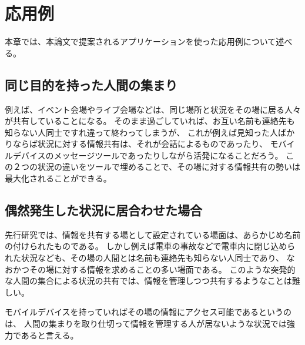 \chapter{応用例}\label{chap:application}

本章では、本論文で提案されるアプリケーションを使った応用例について述べる。

\newpage

\section{同じ目的を持った人間の集まり}

例えば、イベント会場やライブ会場などは、同じ場所と状況をその場に居る人々が共有していることになる。
そのまま過ごしていれば、お互い名前も連絡先も知らない人同士ですれ違って終わってしまうが、
これが例えば見知った人ばかりならば状況に対する情報共有は、それが会話によるものであったり、
モバイルデバイスのメッセージツールであったりしながら活発になることだろう。
この２つの状況の違いをツールで埋めることで、その場に対する情報共有の勢いは最大化されることができる。

\section{偶然発生した状況に居合わせた場合}

先行研究では、情報を共有する場として設定されている場面は、あらかじめ名前の付けられたものである。
しかし例えば電車の事故などで電車内に閉じ込められた状況なども、その場の人間とは名前も連絡先も知らない人同士であり、
なおかつその場に対する情報を求めることの多い場面である。
このような突発的な人間の集合による状況の共有では、情報を管理しつつ共有するようなことは難しい。

モバイルデバイスを持っていればその場の情報にアクセス可能であるというのは、
人間の集まりを取り仕切って情報を管理する人が居ないような状況では強力であると言える。



